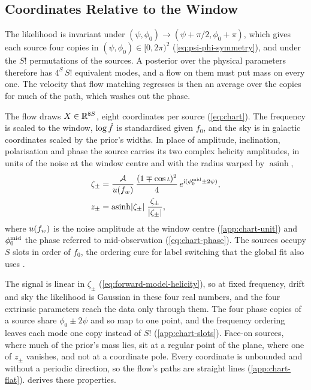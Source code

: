 \subsection{Coordinates Relative to the Window}
\label{sec:method-chart}\label{sec:gw-chart}

The likelihood is invariant under $(\psi,\phi_0)\to(\psi+\pi/2,\phi_0+\pi)$, which gives each source
four copies in $(\psi,\phi_0)\in[0,2\pi)^2$ (\cref{eq:psi-phi-symmetry}), and under the $S!$
permutations of the sources. A posterior over the physical parameters therefore has $4^S\,S!$
equivalent modes, and a flow on them must put mass on every one. The velocity that flow matching
regresses is then an average over the copies for much of the path, which washes out the phase.

The flow draws $X\in\mathbb{R}^{8S}$, eight coordinates per source (\cref{eq:chart}). The frequency is
scaled to the window, $\log\dot f$ is standardised given $f_0$, and the sky is in galactic
coordinates scaled by the prior's widths. In place of amplitude, inclination, polarisation and
phase the source carries its two complex helicity amplitudes, in units of the noise at the window
centre and with the radius warped by $\operatorname{asinh}$,
\begin{equation}
\begin{aligned}
  \zeta_\pm &= \frac{\mathcal{A}}{u(f_{w})}\,\frac{(1\mp\cos\iota)^2}{4}\,e^{\mathrm{i}(\phi_0^{\rm mid}\pm2\psi)},\\
  z_\pm &= \operatorname{asinh}\lvert\zeta_\pm\rvert\;\frac{\zeta_\pm}{\lvert\zeta_\pm\rvert},
\end{aligned}
  \label{eq:chart-helicity}
\end{equation}
where $u(f_{w})$ is the noise amplitude at the window centre (\cref{app:chart-unit}) and
$\phi_0^{\rm mid}$ the phase referred to mid-observation (\cref{eq:chart-phase}). The sources occupy
$S$ slots in order of $f_0$, the ordering cure for label switching
\citep{stephens2000dealing,jasra2005markov,buscicchio2019label} that the global fit also uses
\citep{littenberg2020global}.

The signal is linear in $\zeta_\pm$ (\cref{eq:forward-model-helicity}), so at fixed frequency, drift
and sky the likelihood is Gaussian in these four real numbers, and the four extrinsic parameters
reach the data only through them. The four phase copies of a source share $\phi_0\pm2\psi$ and so
map to one point, and the frequency ordering leaves each mode one copy instead of $S!$
(\cref{app:chart-slots}). Face-on sources, where much of the prior's mass lies, sit at a regular point of the
plane, where one of $z_\pm$ vanishes, and not at a coordinate pole. Every coordinate is unbounded and
without a periodic direction, so the flow's paths are straight lines (\cref{app:chart-flat}).
 derives these properties.

